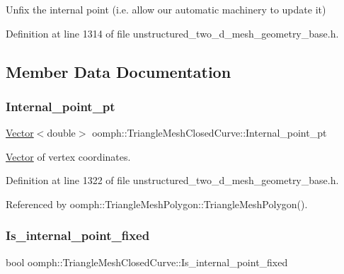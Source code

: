 Unfix the internal point (i.\+e. allow our automatic machinery to update it) 

Definition at line 1314 of file unstructured\+\_\+two\+\_\+d\+\_\+mesh\+\_\+geometry\+\_\+base.\+h.



\subsection{Member Data Documentation}
\mbox{\label{classoomph_1_1TriangleMeshClosedCurve_a4f54902fa364f654bb9d88c442b2caba}} 
\subsubsection{\texorpdfstring{Internal\+\_\+point\+\_\+pt}{Internal\_point\_pt}}
{\footnotesize\ttfamily \hyperlink{classoomph_1_1Vector}{Vector}$<$double$>$ oomph\+::\+Triangle\+Mesh\+Closed\+Curve\+::\+Internal\+\_\+point\+\_\+pt\hspace{0.3cm}{\ttfamily [protected]}}



\hyperlink{classoomph_1_1Vector}{Vector} of vertex coordinates. 



Definition at line 1322 of file unstructured\+\_\+two\+\_\+d\+\_\+mesh\+\_\+geometry\+\_\+base.\+h.



Referenced by oomph\+::\+Triangle\+Mesh\+Polygon\+::\+Triangle\+Mesh\+Polygon().

\mbox{\label{classoomph_1_1TriangleMeshClosedCurve_a66151b7e98cf4871932a6ede46b02e55}} 
\subsubsection{\texorpdfstring{Is\+\_\+internal\+\_\+point\+\_\+fixed}{Is\_internal\_point\_fixed}}
{\footnotesize\ttfamily bool oomph\+::\+Triangle\+Mesh\+Closed\+Curve\+::\+Is\+\_\+internal\+\_\+point\+\_\+fixed\hspace{0.3cm}{\ttfamily [protected]}}



